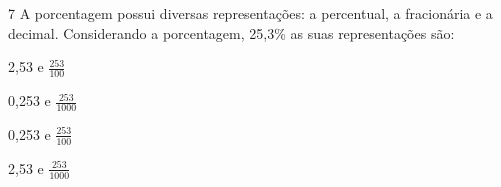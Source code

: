 

\num{7} A porcentagem possui diversas representações: a percentual, a
fracionária e a decimal. Considerando a porcentagem, 25,3\% as suas
representações são:

\begin{escolha}
\item 2,53 e $\frac{253}{100} $
\item 0,253 e $\frac{253}{1000} $
\item 0,253 e $\frac{253}{100} $
\item 2,53 e $\frac{253}{1000}$
\end{escolha}




